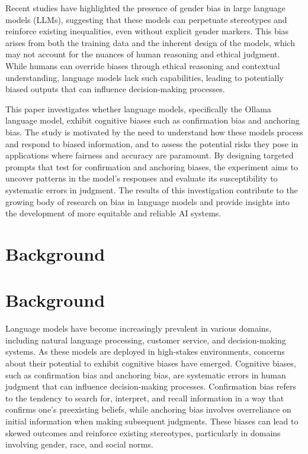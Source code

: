 \documentclass{article}
\begin{document}
Recent studies have highlighted the presence of gender bias in large language models (LLMs), suggesting that these models can perpetuate stereotypes and reinforce existing inequalities, even without explicit gender markers. This bias arises from both the training data and the inherent design of the models, which may not account for the nuances of human reasoning and ethical judgment. While humans can override biases through ethical reasoning and contextual understanding, language models lack such capabilities, leading to potentially biased outputs that can influence decision-making processes.

This paper investigates whether language models, specifically the Ollama language model, exhibit cognitive biases such as confirmation bias and anchoring bias. The study is motivated by the need to understand how these models process and respond to biased information, and to assess the potential risks they pose in applications where fairness and accuracy are paramount. By designing targeted prompts that test for confirmation and anchoring biases, the experiment aims to uncover patterns in the model's responses and evaluate its susceptibility to systematic errors in judgment. The results of this investigation contribute to the growing body of research on bias in language models and provide insights into the development of more equitable and reliable AI systems.
\section{Background}
\section*{Background}

Language models have become increasingly prevalent in various domains, including natural language processing, customer service, and decision-making systems. As these models are deployed in high-stakes environments, concerns about their potential to exhibit cognitive biases have emerged. Cognitive biases, such as confirmation bias and anchoring bias, are systematic errors in human judgment that can influence decision-making processes. Confirmation bias refers to the tendency to search for, interpret, and recall information in a way that confirms one's preexisting beliefs, while anchoring bias involves overreliance on initial information when making subsequent judgments. These biases can lead to skewed outcomes and reinforce existing stereotypes, particularly in domains involving gender, race, and social norms.
\end{document}
